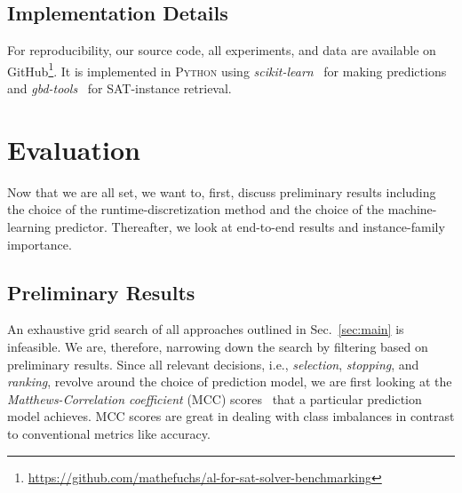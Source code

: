 \documentclass[runningheads]{llncs}
\begin{document}

\subsection{Implementation Details}
For reproducibility, our source code, all experiments, and data are available on GitHub\footnote{\url{https://github.com/mathefuchs/al-for-sat-solver-benchmarking}}.
It is implemented in \textsc{Python} using \textit{scikit-learn}~\cite{scikit-learn} for making predictions and \textit{gbd-tools}~\cite{IserS18} for SAT-instance retrieval.


\section{Evaluation}
\label{sec:eval}
Now that we are all set, we want to, first, discuss preliminary results including the choice of the runtime-discretization method and the choice of the machine-learning predictor.
Thereafter, we look at end-to-end results and instance-family importance.

\subsection{Preliminary Results}
\label{sec:evalprel}
An exhaustive grid search of all approaches outlined in Sec.~\ref{sec:main} is infeasible.
We are, therefore, narrowing down the search by filtering based on preliminary results.
Since all relevant decisions, i.e., \textit{selection}, \textit{stopping}, and \textit{ranking}, revolve around the choice of prediction model, we are first looking at the \textit{Matthews-Correlation coefficient} (MCC) scores~\cite{gorodkin2004comparing,matthews1975comparison} that a particular prediction model achieves.
MCC scores are great in dealing with class imbalances in contrast to conventional metrics like accuracy.
\end{document}
